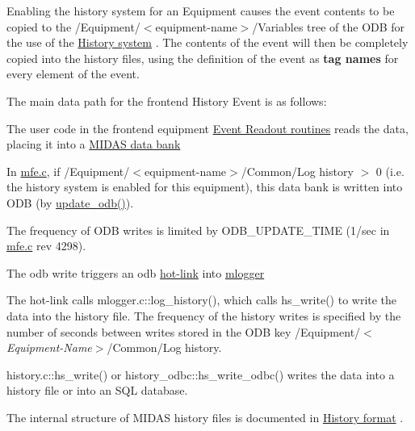 \par
 Enabling the history system for an Equipment causes the event contents to be copied to the /Equipment/$<$equipment-\/name$>$/Variables tree of the ODB for the use of the \hyperlink{F_MainElements_F_History_System_overview}{History system} . The contents of the event will then be completely copied into the history files, using the definition of the event as {\bfseries  tag names } for every element of the event. \par


The main data path for the frontend History Event is as follows:
\begin{DoxyEnumerate}
\item The user code in the frontend equipment \hyperlink{FE_eq_event_routines_FE_readout_routine}{Event Readout routines} reads the data, placing it into a \hyperlink{FE_bank_construction_FE_MIDAS_event_construction}{MIDAS data bank}
\item In \hyperlink{mfe_8c}{mfe.c}, if /Equipment/$<$equipment-\/name$>$/Common/Log history $>$ 0 (i.e. the history system is enabled for this equipment), this data bank is written into ODB (by \hyperlink{mfe_8c_acca4a95b509b37c83c2e76cb88de232a}{update\_\-odb()}).
\end{DoxyEnumerate}

\label{F_History_logging_idx_hotlink_history-event}
\hypertarget{F_History_logging_idx_hotlink_history-event}{}
 \label{F_History_logging_F_history_hot_link}
\hypertarget{F_History_logging_F_history_hot_link}{}
 The frequency of ODB writes is limited by ODB\_\-UPDATE\_\-TIME (1/sec in \hyperlink{mfe_8c}{mfe.c} rev 4298).
\begin{DoxyEnumerate}
\item The odb write triggers an odb \hyperlink{RC_Hot_Link}{hot-\/link} into \hyperlink{F_Logging_F_mlogger_utility}{mlogger}
\item The hot-\/link calls mlogger.c::log\_\-history(), which calls hs\_\-write() to write the data into the history file. The frequency of the history writes is specified by the number of seconds between writes stored in the ODB key /Equipment/$<${\itshape Equipment-\/Name\/}$>$/Common/Log history.
\item history.c::hs\_\-write() or history\_\-odbc::hs\_\-write\_\-odbc() writes the data into a history file or into an SQL database.
\end{DoxyEnumerate}

The internal structure of MIDAS history files is documented in \hyperlink{F_History_logging_F_History_format}{History format} . \par


